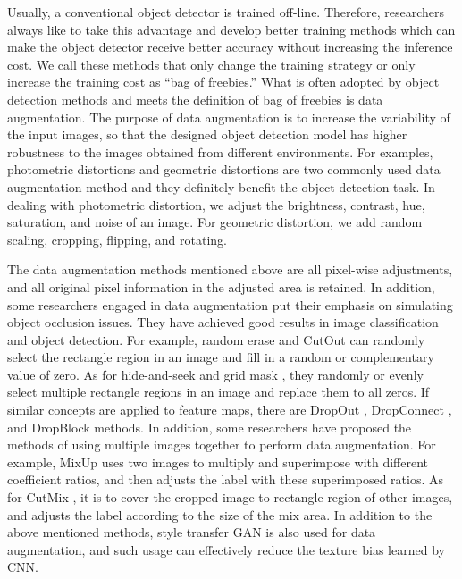 \documentclass[10pt,twocolumn,letterpaper]{article}
\begin{document}
Usually, a conventional object detector is trained off-line. Therefore, researchers always like to take this advantage and develop better training methods which can make the object detector receive better accuracy without increasing the inference cost. We call these methods that only change the training strategy or only increase the training cost as ``bag of freebies.'' What is often adopted by object detection methods and meets the definition of bag of freebies is data augmentation. The purpose of data augmentation is to increase the variability of the input images, so that the designed object detection model has higher robustness to the images obtained from different environments. For examples, photometric distortions and geometric distortions are two commonly used data augmentation method and they definitely benefit the object detection task. In dealing with photometric distortion, we adjust the brightness, contrast, hue, saturation, and noise of an image. For geometric distortion, we add random scaling, cropping, flipping, and rotating.

The data augmentation methods mentioned above are all pixel-wise adjustments, and all original pixel information in the adjusted area is retained. In addition, some researchers engaged in data augmentation put their emphasis on simulating object occlusion issues. They have achieved good results in image classification and object detection. For example, random erase \cite{zhong2017random} and CutOut \cite{devries2017improved} can randomly select the rectangle region in an image and fill in a random or complementary value of zero. As for hide-and-seek \cite{singh2018hide} and grid mask \cite{chen2020gridmask}, they randomly or evenly select multiple rectangle regions in an image and replace them to all zeros. If similar concepts are applied to feature maps, there are DropOut \cite{srivastava2014dropout}, DropConnect \cite{wan2013regularization}, and DropBlock \cite{ghiasi2018dropblock} methods. In addition, some researchers have proposed the methods of using multiple images together to perform data augmentation. For example, MixUp \cite{zhang2017mixup} uses two images to multiply and superimpose with different coefficient ratios, and then adjusts the label with these superimposed ratios. As for CutMix \cite{yun2019cutmix}, it is to cover the cropped image to rectangle region of other images, and adjusts the label according to the size of the mix area. In addition to the above mentioned methods, style transfer GAN \cite{geirhos2018imagenet} is also used for data augmentation, and such usage can effectively reduce the texture bias learned by CNN.
\end{document}
